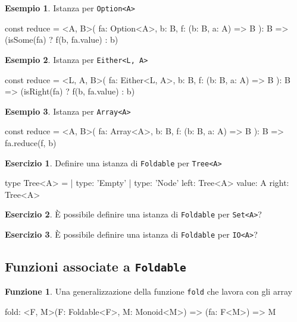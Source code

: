 \documentclass[12pt]{article}
\theoremstyle{definition}
\newtheorem{example}{Esempio}[section]
\newtheorem{exercise}{Esercizio}[section]
\newtheorem{function}{Funzione}[section]
\newenvironment{code}
  {\vspace{0.5cm} \VerbatimEnvironment\begin{typescriptcode}}
  {\end{typescriptcode} \vspace{0.2cm}}
\begin{document}
\begin{example}
Istanza per \texttt{Option<A>}

\begin{code}
const reduce = <A, B>(
  fa: Option<A>,
  b: B,
  f: (b: B, a: A) => B
): B => (isSome(fa) ? f(b, fa.value) : b)
\end{code}
\end{example}

\begin{example}
Istanza per \texttt{Either<L, A>}

\begin{code}
const reduce = <L, A, B>(
  fa: Either<L, A>,
  b: B,
  f: (b: B, a: A) => B
): B => (isRight(fa) ? f(b, fa.value) : b)
\end{code}
\end{example}

\begin{example}
Istanza per \texttt{Array<A>}

\begin{code}
const reduce = <A, B>(
  fa: Array<A>,
  b: B,
  f: (b: B, a: A) => B
): B => fa.reduce(f, b)
\end{code}
\end{example}

\begin{exercise}
Definire una istanza di \texttt{Foldable} per \texttt{Tree<A>}

\begin{code}
type Tree<A> =
  | { type: 'Empty' }
  | {
      type: 'Node'
      left: Tree<A>
      value: A
      right: Tree<A>
    }
\end{code}
\end{exercise}

\begin{exercise}
È possibile definire una istanza di \texttt{Foldable} per \texttt{Set<A>}?
\end{exercise}

\begin{exercise}
È possibile definire una istanza di \texttt{Foldable} per \texttt{IO<A>}?
\end{exercise}

\subsection{Funzioni associate a \texttt{Foldable}}

\begin{function}
Una generalizzazione della funzione \texttt{fold} che lavora con gli array

\begin{code}
fold: <F, M>(F: Foldable<F>, M: Monoid<M>) => (fa: F<M>) => M
\end{code}
\end{function}
\end{document}
